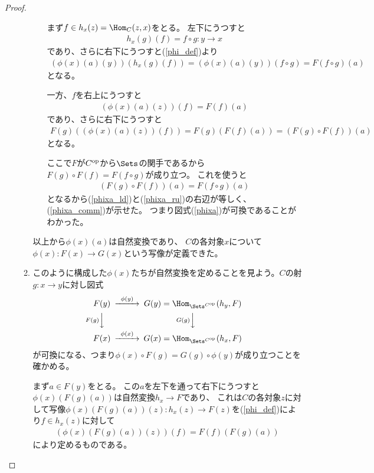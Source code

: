 \documentclass[uplatex]{jsarticle}
\begin{document}
\begin{proof}
\begin{enumerate}
\begin{enumerate}
\begin{enumerate}
まず$f\in h_x(z)=\Hom_C(z,x)$をとる。
左下にうつすと
\begin{align*}
h_x(g)(f) = f\circ g:y \to x
\end{align*}であり、さらに右下にうつすと(\ref{phi_def})より
\begin{align}\label{phixa_ld}
(\phi(x)(a)(y))(h_x(g)(f))=(\phi(x)(a)(y))(f\circ g)=F(f\circ g)(a)
\end{align}
となる。

一方、$f$を右上にうつすと
\begin{align*}
(\phi(x)(a)(z))(f) = F(f)(a)
\end{align*}
であり、さらに右下にうつすと
\begin{align}\label{phixa_ru}
F(g)((\phi(x)(a)(z))(f)) = F(g)(F(f)(a)) =(F(g)\circ F(f))(a)
\end{align}
となる。

ここで$F$が$C^{\rm op}$から$\Sets$の関手であるから$F(g)\circ F(f)=F(f \circ g)$が成り立つ。
これを使うと
\begin{align*}
(F(g)\circ F(f))(a)=F(f \circ g)(a)
\end{align*}
となるから(\ref{phixa_ld})と(\ref{phixa_ru})の右辺が等しく、(\ref{phixa_comm})が示せた。
つまり図式(\ref{phixa})が可換であることがわかった。
\end{enumerate}
以上から$\phi(x)(a)$は自然変換であり、
$C$の各対象$x$について$\phi(x):F(x)\to G(x)$という写像が定義できた。

\item このように構成した$\phi(x)$たちが自然変換を定めることを見よう。$C$の射$g:x\to y$に対し図式
\begin{align}\label{phi_comm}
\begin{CD}
F(y)@>\phi(y)>>G(y)=\Hom_{\Sets^{C^{\rm op}}}(h_y,F)\\
@VF(g)VV@VG(g)VV\\
F(x)@>\phi(x)>>G(x)=\Hom_{\Sets^{C^{\rm op}}}(h_x,F)
\end{CD}
\end{align}
が可換になる、つまり$\phi(x)\circ F(g)=G(g)\circ\phi(y)$が成り立つことを確かめる。

まず$a\in F(y)$をとる。
この$a$を左下を通って右下にうつすと$\phi(x)(F(g)(a))$は自然変換$h_x\to F$であり、
これは$C$の各対象$z$に対して写像$\phi(x)(F(g)(a))(z):h_x(z) \to F(z)$を(\ref{phi_def})により$f\in h_x(z)$に対して
\begin{align}\label{phix_ld}
(\phi(x)(F(g)(a))(z))(f)=F(f)(F(g)(a))
\end{align}
により定めるものである。


\end{enumerate}
\end{enumerate}
\end{proof}
\end{document}
